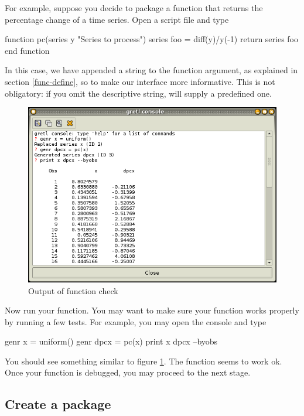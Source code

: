For example, suppose you decide to package a function that returns the
percentage change of a time series. Open a script file and type
\begin{code}
function pc(series y "Series to process")
  series foo = diff(y)/y(-1)
  return series foo
end function
\end{code}
In this case, we have appended a string to the function
argument, as explained in section \ref{func-define}, so to make our
interface more informative. This is not obligatory: if you omit the
descriptive string,  will supply a predefined one.

\begin{figure}[htbp]
  \centering
  \includegraphics[scale=0.5]{figures/func_check}
  \caption{Output of function check}
  \label{fig:func_check}
\end{figure}

Now run your function. You may want to make sure your function works
properly by running a few tests. For example, you may open the console
and type

\begin{code}
genr x = uniform()
genr dpcx = pc(x)
print x dpcx --byobs
\end{code}

You should see something similar to figure \ref{fig:func_check}. The
function seems to work ok. Once your function is debugged, you
may proceed to the next stage.

\subsection{Create a package}

